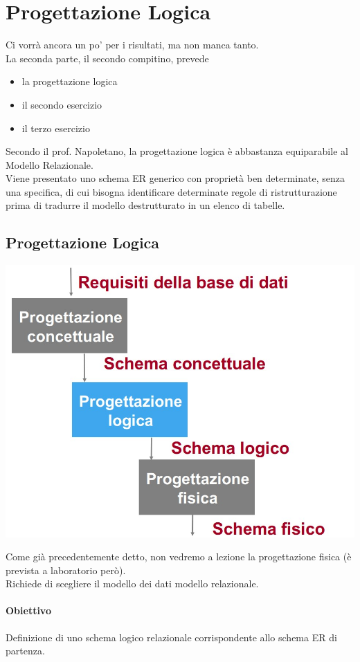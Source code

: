 \chapter{Progettazione Logica}
Ci vorrà ancora un po' per i risultati, ma non manca tanto.\\
La seconda parte, il secondo compitino, prevede 
\begin{itemize}
    \item la progettazione logica
    \item il secondo esercizio
    \item il terzo esercizio
\end{itemize}
Secondo il prof. Napoletano, la progettazione logica è abbastanza equiparabile al Modello Relazionale.\\
Viene presentato uno schema ER generico con proprietà ben determinate, senza una specifica, di cui bisogna identificare determinate regole di ristrutturazione prima di tradurre il modello destrutturato in un elenco di tabelle.
\section{Progettazione Logica}
\begin{center}
    \includegraphics[scale=0.675]{chaptersLezioniSara/img/PLog_intro1.jpg}
\end{center}
Come già precedentemente detto, non vedremo a lezione la progettazione fisica (è prevista a laboratorio però).\\
Richiede di scegliere il modello dei dati modello relazionale.
\subsubsection{Obiettivo}
Definizione di uno schema logico relazionale corrispondente allo schema ER di partenza.
